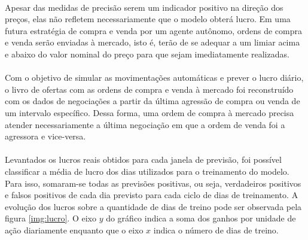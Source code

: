 \documentclass[grad,numbers]{coppe}
\begin{document}
            
            \paragraph{}Apesar das medidas de precisão serem um indicador positivo na direção dos preços, elas não refletem necessariamente que o modelo obterá lucro. Em uma futura estratégia de compra e venda por um agente autônomo, ordens de compra e venda serão enviadas à mercado, isto é, terão de se adequar a um limiar acima e abaixo do valor nominal do preço para que sejam imediatamente realizadas. 
            
            \paragraph{}Com o objetivo de simular as movimentações automáticas e prever o lucro diário, o livro de ofertas com as ordens de compra e venda à mercado foi reconstruído com os dados de negociações a partir da última agressão de compra ou venda de um intervalo específico. Dessa forma, uma ordem de compra à mercado precisa atender necessariamente a última negociação em que a ordem de venda foi a agressora e vice-versa.
            
            \paragraph{}Levantados os lucros reais obtidos para cada janela de previsão, foi possível classificar a média de lucro dos dias utilizados para o treinamento do modelo. Para isso, somaram-se todas as previsões positivas, ou seja, verdadeiros positivos e falsos positivos de cada dia previsto para cada ciclo de dias de treinamento. A evolução dos lucros sobre a quantidade de dias de treino pode ser observada pela figura \ref{img:lucro}. O eixo $y$ do gráfico indica a soma dos ganhos por unidade de ação diariamente enquanto que o eixo $x$ indica o número de dias de treino.
            
\end{document}
